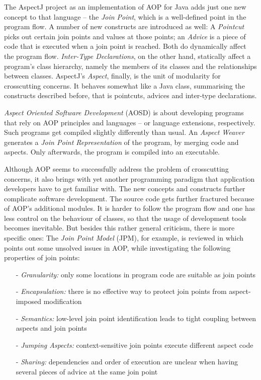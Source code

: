 The AspectJ project as an implementation of AOP for Java adds just one new
concept to that language -- the \emph{Join Point}, which is a well-defined
point in the program flow. A number of new constructs are introduced as well: A
\emph{Pointcut} picks out certain join points and values at those points; an
\emph{Advice} is a piece of code that is executed when a join point is reached.
Both do dynamically affect the program flow. \emph{Inter-Type Declarations}, on
the other hand, statically affect a program's class hierarchy, namely the
members of its classes and the relationships between classes. AspectJ's
\emph{Aspect}, finally, is the unit of modularity for crosscutting concerns. It
behaves somewhat like a Java class, summarising the constructs described
before, that is pointcuts, advices and inter-type declarations.

\emph{Aspect Oriented Software Development} (AOSD) is about developing programs
that rely on AOP principles and languages -- or language extensions,
respectively. Such programs get compiled slightly differently than usual. An
\emph{Aspect Weaver} generates a \emph{Join Point Representation} of the
program, by merging code and aspects. Only afterwards, the program is compiled
into an executable.

Although AOP seems to successfully address the problem of crosscutting concerns,
it also brings with yet another programming paradigm that application developers
have to get familiar with. The new concepts and constructs further complicate
software development. The source code gets further fractured because of AOP's
additional modules. It is harder to follow the program flow and one has less
control on the behaviour of classes, so that the usage of development tools
becomes inevitable. But besides this rather general criticism, there is more
specific ones: The \emph{Join Point Model} (JPM), for example, is reviewed in
\cite{huttenhuis} which points out some unsolved issues in AOP, while
investigating the following properties of join points:

\begin{itemize}
    \item[-] \emph{Granularity:} only some locations in program code are
        suitable as join points
    \item[-] \emph{Encapsulation:} there is no effective way to protect join
        points from aspect-imposed modification
    \item[-] \emph{Semantics:} low-level join point identification leads to
        tight coupling between aspects and join points
    \item[-] \emph{Jumping Aspects:} context-sensitive join points execute
        different aspect code
    \item[-] \emph{Sharing:} dependencies and order of execution are unclear
        when having several pieces of advice at the same join point
\end{itemize}

